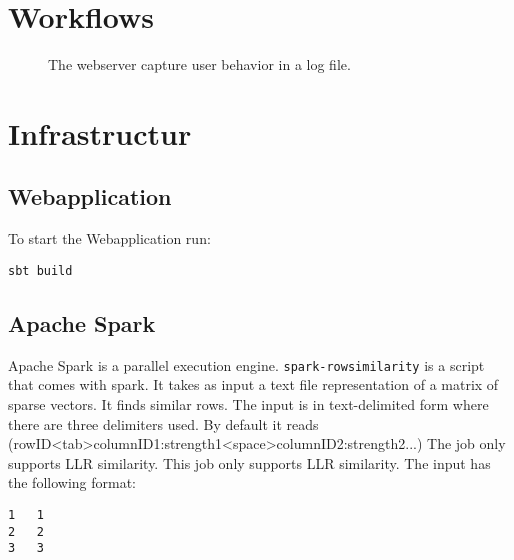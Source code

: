 \documentclass[twoside,a4paper]{article}
\begin{document}

\section{Workflows}
\label{sec:workflows}

\begin{figure}
\centering
{}
\caption{The webserver capture user behavior in a log file.}
\end{figure}

\section{Infrastructur}
\label{sec:infrastructur}

\subsection{Webapplication}
\label{sec:web}

To start the Webapplication run:
\begin{verbatim}
sbt build 
\end{verbatim}

\subsection{Apache Spark}
\label{sec:spark}
Apache Spark is a parallel execution engine.
\verb|spark-rowsimilarity| is a script that comes with spark. It takes as input a text file representation of a matrix of sparse vectors. It finds similar rows. The input is in text-delimited form where there are three delimiters used. By default it reads (rowID<tab>columnID1:strength1<space>columnID2:strength2...) The job only supports LLR similarity. This job only supports LLR similarity.
The input has the following format:
\begin{verbatim}
1	1
2	2
3	3 
\end{verbatim}
\end{document}
